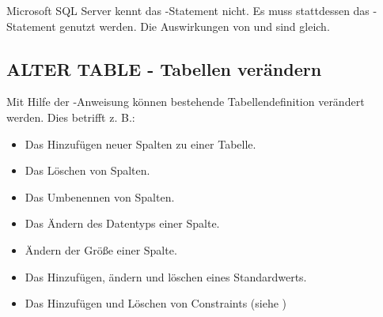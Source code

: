         \begin{merke}
          Microsoft SQL Server kennt das -Statement nicht. Es muss stattdessen das -Statement genutzt werden. Die Auswirkungen von  und  sind gleich.
        \end{merke}
      \subsection{ALTER TABLE - Tabellen verändern}
        Mit Hilfe der -Anweisung können bestehende Tabellendefinition verändert werden. Dies betrifft z. B.:
        \begin{itemize}
          \item Das Hinzufügen neuer Spalten zu einer Tabelle.
          \item Das Löschen von Spalten.
          \item Das Umbenennen von Spalten.
          \item Das Ändern des Datentyps einer Spalte.
          \item Ändern der Größe einer Spalte.
          \item Das Hinzufügen, ändern und löschen eines Standardwerts.
          \item Das Hinzufügen und Löschen von Constraints (siehe )
        \end{itemize}
		\clearpage
